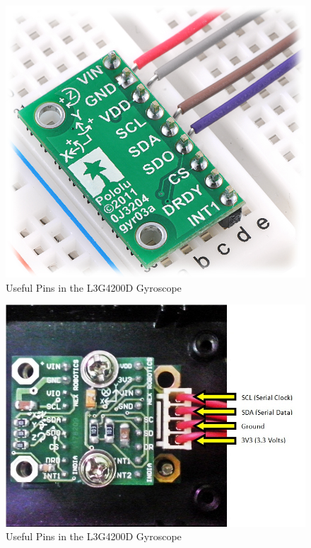 \documentclass[a4paper,12 pt]{article}
\begin{document}
\begin{figure}[!h]
\begin{center}
 \includegraphics[scale=0.30]{gyr2.jpg}
\end{center}
\caption{Useful Pins in the L3G4200D Gyroscope}
\label{fig:1}
\end{figure}
\begin{figure}[!h]
\begin{center}
 \includegraphics[scale=0.60]{gyr7.jpg}
\end{center}
\caption{Useful Pins in the L3G4200D Gyroscope}
\label{fig:1}
\end{figure}
\end{document}
